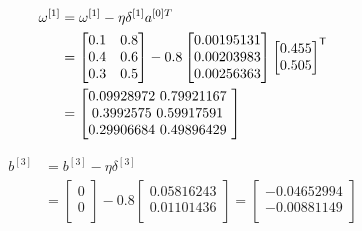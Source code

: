 \documentclass{article}
\begin{document}
\[
    \begin{aligned}
        \omega^{[1]} & =\omega^{[1]}-\eta\delta^{[1]}a^{[0]T} \\
                     & =\begin{bmatrix}
                            0.1 & 0.8 \\
                            0.4 & 0.6 \\
                            0.3 & 0.5 \\
                        \end{bmatrix}
        - 0.8 \begin{bmatrix}
                  0.00195131 \\
                  0.00203983 \\
                  0.00256363 \\
              \end{bmatrix}
        \begin{bmatrix}
            0.455 \\
            0.505 \\
        \end{bmatrix}^{\mathsf{T}}                      \\
                     & = \begin{bmatrix}
                             0.09928972 $ 0.79921167 $ \\
                             0.3992575  $ 0.59917591 $ \\
                             0.29906684 $ 0.49896429 $ \\
                         \end{bmatrix}
    \end{aligned}
\]

\[
    \begin{aligned}
        b^{[3]} & =b^{[3]}-\eta\delta^{[3]} \\
                & =\begin{bmatrix}
                       0 \\
                       0 \\
                   \end{bmatrix}
        - 0.8 \begin{bmatrix}
                  0.05816243 \\
                  0.01101436 \\
              \end{bmatrix}
        = \begin{bmatrix}
              -0.04652994 \\
              -0.00881149 \\
          \end{bmatrix}
    \end{aligned}
\]
\end{document}
